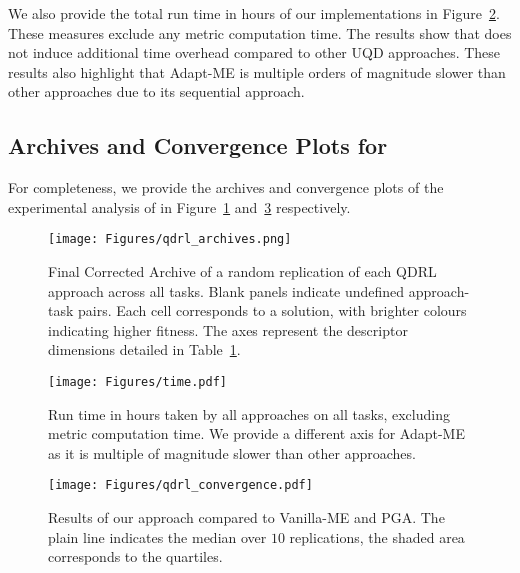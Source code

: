 We also provide the total run time in hours of our implementations in Figure~\ref{fig:time}. These measures exclude any metric computation time. 
The results show that \name{} does not induce additional time overhead compared to other UQD approaches. 
These results also highlight that Adapt-ME is multiple orders of magnitude slower than other approaches due to its sequential approach. 


\subsection{Archives and Convergence Plots for \namepga{}}

For completeness, we provide the archives and convergence plots of the experimental analysis of \namepga{} in Figure~\ref{fig:archives_qdrl} and~\ref{fig:qdrl_convergence} respectively. 



\begin{figure}[t!]
  \centering
  \texttt{[image: Figures/qdrl\_archives.png]}
  \caption{
    Final Corrected Archive of a random replication of each QDRL approach across all tasks. Blank panels indicate undefined approach-task pairs. 
    Each cell corresponds to a solution, with brighter colours indicating higher fitness. The axes represent the descriptor dimensions detailed in Table~\ref{fig:archives_qdrl}.
  }
  \label{fig:archives_qdrl}
\end{figure}

\begin{figure}[t!]
  \centering
  \texttt{[image: Figures/time.pdf]}
  \caption{
    Run time in hours taken by all approaches on all tasks, excluding metric computation time. We provide a different axis for Adapt-ME as it is multiple of magnitude slower than other approaches. 
  }
  \vspace{-2mm}
  \label{fig:time}
\end{figure}


\begin{figure}[t!]
  \centering
  \texttt{[image: Figures/qdrl\_convergence.pdf]}
  \caption{
    Results of our \namepga{}{} approach compared to Vanilla-ME and PGA. The plain line indicates the median over $10$ replications, the shaded area corresponds to the quartiles. 
  }
  \vspace{-2mm}
  \label{fig:qdrl_convergence}
\end{figure}






